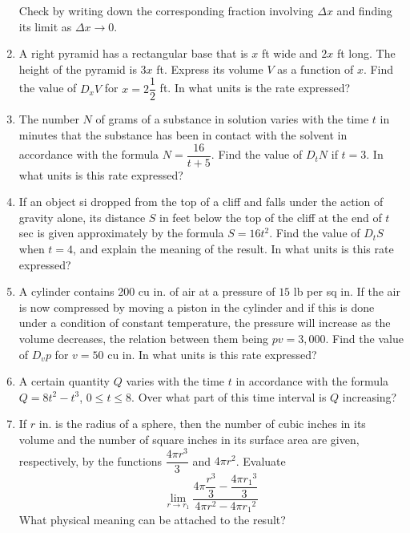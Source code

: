 \documentclass{report}
\begin{document}
\begin{enumerate}
            Check by writing down the corresponding fraction involving $\Delta x$ and
            finding its limit as $\Delta x \to 0$.
      \item A right pyramid has a rectangular base that is $x$ ft wide and $2x$ ft long.
            The height of the pyramid is $3x$ ft. Express its volume $V$ as a function of
            $x$. Find the value of $D_x V$ for $x = 2\dfrac{1}{2}$ ft. In what units is the
            rate expressed?
      \item The number $N$ of grams of a substance in solution varies with the time $t$ in
            minutes that the substance has been in contact with the solvent in accordance
            with the formula $N = \dfrac{16}{t+5}$. Find the value of $D_t N$ if $t = 3$.
            In what units is this rate expressed?
      \item If an object si dropped from the top of a cliff and falls under the action of
            gravity alone, its distance $S$ in feet below the top of the cliff at the end
            of $t$ sec is given approximately by the formula $S = 16t^2$. Find the value of
            $D_t S$ when $t = 4$, and explain the meaning of the result. In what units is
            this rate expressed?
      \item A cylinder contains 200 cu in. of air at a pressure of $15$ lb per sq in. If
            the air is now compressed by moving a piston in the cylinder and if this is
            done under a condition of constant temperature, the pressure will increase as
            the volume decreases, the relation between them being $pv = 3,000$. Find the
            value of $D_v p$ for $v = 50$ cu in. In what units is this rate expressed?
      \item  A certain quantity $Q$ varies with the time $t$ in accordance with the formula
            $Q = 8t^2 - t^3$, $0 \leq t \leq 8$. Over what part of this time interval is
            $Q$ increasing?
      \item If $r$ in. is the radius of a sphere, then the number of cubic inches in its
            volume and the number of square inches in its surface area are given,
            respectively, by the functions $\dfrac{4\pi r^3}{3}$ and $4\pi r^2$. Evaluate \[\lim\limits_{r\rightarrow r_{1}}\frac{4\pi \dfrac{r^{3}}{3}-\dfrac{4\pi {r_{1}}^{3}}{3}}{4\pi r^{2}-4\pi{r_{1}}^{2}}\]
            What physical meaning can be attached to the result?
\end{enumerate}
\end{document}
